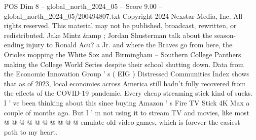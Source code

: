 \begin{textsample}{POS Dim 8 – global\_north\_2024\_05 – Score 9.00 – global\_north\_2024\_05/200494807.txt}
Copyright 2024 Nexstar Media, Inc.
All rights reserved.
This material may not be published, broadcast, rewritten, or redistributed.
Jake Mintz \&amp ; Jordan Shusterman talk about the season-ending injury to Ronald Acu? a Jr. and where the Braves go from here, the Orioles mopping the White Sox and Birmingham -- Southern College Panthers making the College World Series despite their school shutting down.
Data from the Economic Innovation Group ' s ( EIG ) Distressed Communities Index shows that as of 2023, local economies across America still hadn't fully recovered from the effects of the COVID-19 pandemic.
Every cheap streaming stick kind of sucks.
I ' ve been thinking about this since buying Amazon ' s Fire TV Stick 4K Max a couple of months ago.
But I ' m not using it to stream TV and movies, like most @ @ @ @ @ @ @ @ @ @ emulate old video games, which is forever the easiest path to my heart.

\end{textsample}
